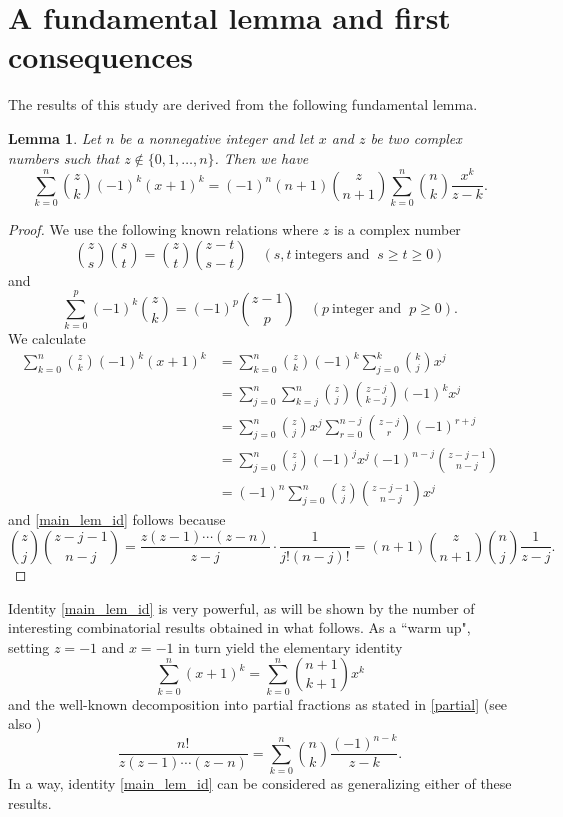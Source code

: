\documentclass[10pt,a4paper]{amsart}
\numberwithin{equation}{section}
\newtheorem{lemma}[thm]{Lemma}
\begin{document}
\section{A fundamental lemma and first consequences}

The results of this study are derived from the following fundamental lemma.

\begin{lemma}
Let $n$ be a nonnegative integer and let $x$ and $z$ be two complex numbers such that $z\notin\{0,1,\ldots,n\}$. Then we have
\begin{equation}\label{main_lem_id}
\sum_{k=0}^n \binom{z}{k} (-1)^k (x+1)^k = (-1)^n (n+1)\binom{z}{n+1} \sum_{k=0}^n \binom{n}{k} \frac{x^k}{z-k}.
\end{equation}
\end{lemma}
\begin{proof}
We use the following known relations where $z$ is a complex number 
\[\binom{z}{s}\binom{s}{t}=\binom{z}{t}\binom{z-t}{s-t}\quad (s,t \ \mbox{integers and } \ s\ge t\ge 0)\]
and
\[\sum_{k=0}^p(-1)^k\binom{z}{k}=(-1)^p\binom{z-1}{p}\quad (p\ \mbox{integer and }\ p\ge 0).\]
We calculate
\begin{align*}
\sum_{k=0}^n \binom{z}{k} (-1)^k (x+1)^k &= \sum_{k=0}^n \binom{z}{k} (-1)^k \sum_{j=0}^k \binom{k}{j} x^j \\
&= \sum_{j=0}^n \sum_{k=j}^n \binom{z}{j} \binom{z-j}{k-j} (-1)^k x^j \\
&= \sum_{j=0}^n \binom{z}{j} x^j \sum_{r=0}^{n-j} \binom{z-j}{r} (-1)^{r+j} \\
&= \sum_{j=0}^n \binom{z}{j} (-1)^j x^j (-1)^{n-j} \binom{z-j-1}{n-j} \\
&= (-1)^n \sum_{j=0}^n \binom{z}{j} \binom{z-j-1}{n-j} x^j
\end{align*}
and \eqref{main_lem_id} follows because
\[\binom{z}{j} \binom{z-j-1}{n-j} = \frac{z(z-1)\cdots(z-n)}{z-j}\cdot\frac{1}{j!(n-j)!} = (n+1)\binom{z}{n+1}\binom{n}{j}\frac{1}{z-j}.\]
\end{proof}

Identity \eqref{main_lem_id} is very powerful, as will be shown by the number of interesting combinatorial results obtained in what follows.
As a ``warm up", setting $z=-1$ and $x=-1$ in turn yield the elementary identity
$$\sum_{k=0}^n (x+1)^k = \sum_{k=0}^n \binom{n+1}{k+1} x^k$$
and the well-known decomposition into partial fractions as stated in \eqref{partial} (see also \cite{Boyadzhiev})
\begin{equation}\label{eq_9} 
\frac{ n!}{z(z-1)\cdots (z-n)} = \sum_{k=0}^n \binom{n}{k} \frac{(-1)^{n-k}}{z-k}.
\end{equation}
In a way, identity \eqref{main_lem_id} can be considered as generalizing either of these results.\\[0.3cm]
\end{document}
